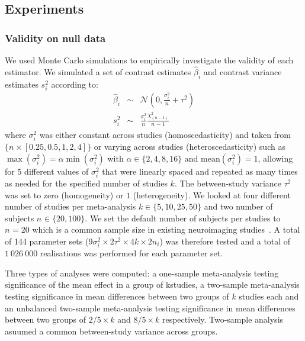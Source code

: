 \documentclass[preprint]{elsarticle}
\newcommand{\effectvector}{\hat\beta}
\newcommand{\effect}[1][i]{\effectvector_{#1}}
\newcommand{\vareffect}[1][i]{s^2_{#1}}
\newcommand{\nStudies}{k}
\newcommand{\varBetween}{\tau^2}
\newcommand{\nSubjects}[1][i]{n_{#1}}
\newcommand{\varWithin}[1][i]{\sigma^2_{#1}}
\begin{document}

\subsection{Experiments}

\subsubsection{Validity on null data}
We used Monte Carlo simulations to empirically investigate the validity of each estimator. We simulated a set of  contrast estimates $\effect$ and contrast variance estimates $\vareffect$ according to:
\begin{eqnarray}
	\effect &\sim& \mathcal{N}(0, \frac{\varWithin}{\nSubjects[]}+\varBetween) \\
	\vareffect &\sim& \frac{\varWithin}{\nSubjects[]}  \frac{\chi^2_{(\nSubjects[]-1)}}{\nSubjects[]-1} %
\end{eqnarray}
where $\varWithin$ was either constant across studies (homoscedasticity) and taken from $\{\nSubjects[] \times [0.25, 0.5, 1, 2, 4] \}$ or varying across studies (heteroscedasticity) such as $\max(\varWithin) = \alpha \min(\varWithin)$ with $\alpha \in \{2, 4, 8, 16\}$ and $\text{mean}(\varWithin) = 1$, allowing for 5 different values of $\varWithin$ that were linearly spaced and repeated as many times as needed for the specified number of studies $\nStudies$. The between-study variance $\varBetween$ was set to zero (homogeneity) or $1$ (heterogeneity). We looked at four different number of studies per meta-analysis $\nStudies \in \{5, 10, 25, 50\}$ and two number of subjects $\nSubjects[] \in \{20, 100\}$. We set the default number of subjects per studies to $\nSubjects[]=20$ which is a common sample size in existing neuroimaging studies~\cite{Poldrack2017}. A total of 144 parameter sets ($9 \varWithin \times 2 \varBetween \times 4 \nStudies \times 2 \nSubjects$) was therefore tested and a total of $1~026~000$ realisations was performed for each parameter set.

Three types of analyses were computed: a one-sample meta-analysis testing significance of the mean effect in a group of \nStudies studies, a two-sample meta-analysis testing significance in mean differences between two groups of $\nStudies$ studies each and an unbalanced two-sample meta-analysis testing significance in mean differences between two groups of $2/5 \times \nStudies$ and $8/5 \times \nStudies$ respectively. Two-sample analysis asuumed a common between-study variance across groups.
\end{document}
